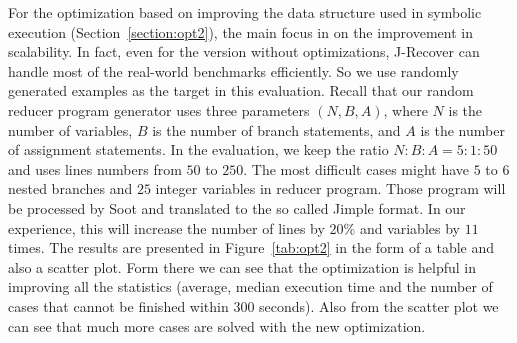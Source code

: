 \documentclass{llncs}
\begin{document}
For the optimization based on improving the data structure used in symbolic execution (Section~\ref{section:opt2}), the main focus in on the improvement in scalability. In fact, even for the version without optimizations, J-Recover can handle most of the real-world benchmarks efficiently. So we use randomly generated examples as the target in this evaluation.  Recall that our random reducer program generator uses three parameters $(N,B,A)$, where $N$ is the number of variables, $B$ is the number of branch statements, and $A$ is the number of assignment statements. In the evaluation, we keep the ratio $N:B:A = 5:1:50$ and uses lines numbers from $50$ to $250$. The most difficult cases might have $5$ to $6$ nested branches and $25$ integer variables in reducer program. Those program will be processed by Soot and translated to the so called Jimple format. In our experience, this will increase the number of lines by $20\%$ and variables by $11$ times. The results are presented in Figure~\ref{tab:opt2} in the form of a table and also a scatter plot. Form there we can see that the optimization is helpful in improving all the statistics (average, median execution time and the number of cases that cannot be finished within 300 seconds). Also from the scatter plot we can see that much more cases are solved with the new optimization.
\end{document}
